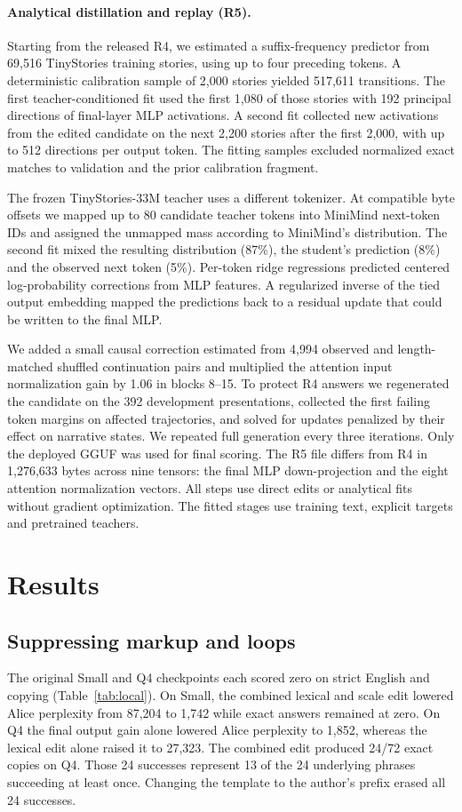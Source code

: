 \documentclass[11pt]{article}
\begin{document}
\paragraph{Analytical distillation and replay (R5).}
Starting from the released R4, we estimated a suffix-frequency predictor from 69,516 TinyStories training stories, using up to four preceding tokens. A deterministic calibration sample of 2,000 stories yielded 517,611 transitions. The first teacher-conditioned fit used the first 1,080 of those stories with 192 principal directions of final-layer MLP activations. A second fit collected new activations from the edited candidate on the next 2,200 stories after the first 2,000, with up to 512 directions per output token. The fitting samples excluded normalized exact matches to validation and the prior calibration fragment.

The frozen TinyStories-33M teacher \citep{teacher} uses a different tokenizer. At compatible byte offsets we mapped up to 80 candidate teacher tokens into MiniMind next-token IDs and assigned the unmapped mass according to MiniMind's distribution. The second fit mixed the resulting distribution (87\%), the student's prediction (8\%) and the observed next token (5\%). Per-token ridge regressions predicted centered log-probability corrections from MLP features. A regularized inverse of the tied output embedding mapped the predictions back to a residual update that could be written to the final MLP.

We added a small causal correction estimated from 4,994 observed and length-matched shuffled continuation pairs and multiplied the attention input normalization gain by 1.06 in blocks 8--15. To protect R4 answers we regenerated the candidate on the 392 development presentations, collected the first failing token margins on affected trajectories, and solved for updates penalized by their effect on narrative states. We repeated full generation every three iterations. Only the deployed GGUF was used for final scoring. The R5 file differs from R4 in 1,276,633 bytes across nine tensors: the final MLP down-projection and the eight attention normalization vectors. All steps use direct edits or analytical fits without gradient optimization. The fitted stages use training text, explicit targets and pretrained teachers.

\section{Results}
\subsection{Suppressing markup and loops}
The original Small and Q4 checkpoints each scored zero on strict English and copying (Table~\ref{tab:local}). On Small, the combined lexical and scale edit lowered Alice perplexity from 87,204 to 1,742 while exact answers remained at zero. On Q4 the final output gain alone lowered Alice perplexity to 1,852, whereas the lexical edit alone raised it to 27,323. The combined edit produced 24/72 exact copies on Q4. Those 24 successes represent 13 of the 24 underlying phrases succeeding at least once. Changing the template to the author's prefix erased all 24 successes.
\end{document}
